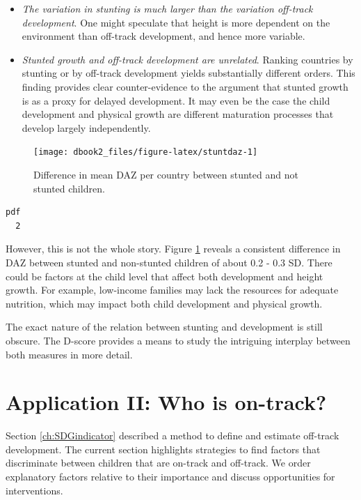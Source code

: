 \documentclass[
]{book}
\providecommand{\tightlist}{%
  \setlength{\itemsep}{0pt}\setlength{\parskip}{0pt}}
\begin{document}
\begin{itemize}
\tightlist
\item
  \emph{The variation in stunting is much larger than the variation off-track development}. One might speculate that height is more dependent on the environment than off-track development, and hence more variable.
\item
  \emph{Stunted growth and off-track development are unrelated}. Ranking countries by stunting or by off-track development yields substantially different orders. This finding provides clear counter-evidence to the argument that stunted growth is as a proxy for delayed development. It may even be the case the child development and physical growth are different maturation processes that develop largely independently.
\end{itemize}

\begin{figure}

{\centering \texttt{[image: dbook2\_files/figure-latex/stuntdaz-1]} 

}

\caption{Difference in mean DAZ per country between stunted and not stunted children.}\label{fig:stuntdaz}
\end{figure}

\begin{verbatim}
pdf 
  2 
\end{verbatim}



However, this is not the whole story. Figure \ref{fig:stuntdaz} reveals a consistent difference in DAZ between stunted and non-stunted children of about 0.2 - 0.3 SD. There could be factors at the child level that affect both development and height growth. For example, low-income families may lack the resources for adequate nutrition, which may impact both child development and physical growth.

The exact nature of the relation between stunting and development is still obscure. The D-score provides a means to study the intriguing interplay between both measures in more detail.

\newpage

\hypertarget{ch:ontrack}{%
\chapter{Application II: Who is on-track?}\label{ch:ontrack}}

Section \ref{ch:SDGindicator} described a method to define and estimate off-track development. The current section highlights strategies to find factors that discriminate between children that are on-track and off-track. We order explanatory factors relative to their importance and discuss opportunities for interventions.
\end{document}
